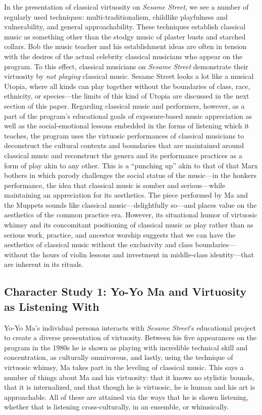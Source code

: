 \documentclass[12pt,letterpaper]{article}
\newcommand{\ses}{\textit{Sesame Street }}
\begin{document}
	In the presentation of classical virtuosity on \textit{Sesame Street},
	we see a number
	of regularly used techniques: multi-traditionalism, childlike 
	playfulness and vulnerability, and general approachability. These 
	techniques establish classical music as something other than the stodgy 
	music of plaster busts and starched collars. Bob the music teacher and 
	his establishment ideas are often in tension with the desires of the 
	actual celebrity classical musicians who appear on the program. 
	To this effect, classical musicians on \ses demonstrate their 
	virtuosity by \textit{not playing} classical music. Sesame
	Street looks a lot like a musical Utopia, where all kinds can play 
	together without the boundaries of class, race, ethnicity, or 
	species---the limits of this kind of Utopia are discussed in the next 
	section of this paper. Regarding classical music and performers,
	however, as a part of the program's educational goals of exposure-based
	music appreciation as well as the social-emotional lessons embedded 
	in the forms of listening which it teaches, the program uses the 
	virtuosic performances of classical musicians to deconstruct the
	cultural contexts and boundaries that are maintained around classical
	music and reconstruct the genera and its performance practices as a 
	form of play akin to any other. This is a ``punching up'' akin to that 
	of that Marx bothers in which parody challenges the social status of
	the music---in the honkers performance, the idea that classical music
	is somber and serious---while maintaining an appreciation for its 
	aesthetics. The piece performed by Ma and the Muppets sounds like
	classical music---delightfully so---and places value on the aesthetics 
	of the common practice era. However, its situational humor of virtuosic
	whimsy and its concomitant positioning of classical music as play
	rather than as serious work, practice, and ancestor worship suggests 
	that we can have the aesthetics of classical music 
	without the exclusivity and class boundaries---without the hours of 
	violin lessons and investment in middle-class identity---that are 
	inherent in its rituals. 

	\subsection*{Character Study 1: Yo-Yo Ma and Virtuosity as 
	Listening With} 

	Yo-Yo Ma's individual persona interacts with \textit{Sesame Street}'s
	educational project to create a diverse presentation of virtuosity. 
	Between his five appearances on the program in the 1980s he is shown as 
	playing with incredible technical skill and concentration, as 
	culturally omnivorous, and lastly, using the technique of virtuosic 
	whimsy, Ma 
	takes part in the leveling of classical music. This says a number of 
	things about Ma and his virtuosity: that it knows no stylistic bounds,
	that it is internalized, and that though he is virtuosic, he is 
	human
	and his art is approachable. All of these are attained via the ways
	that he is shown listening, whether that is listening 
	cross-culturally, in an ensemble, or whimsically.  
	
\end{document}
